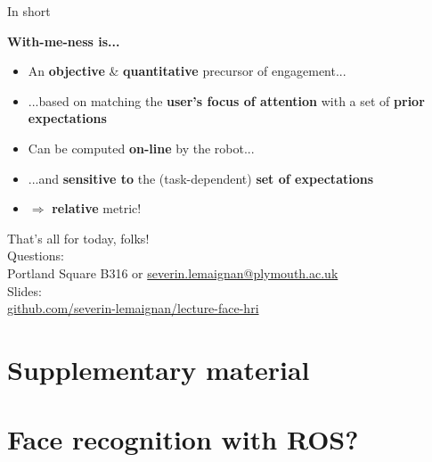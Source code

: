\documentclass[compress]{beamer}
\makeatletter
\def\beamer@writeslidentry@miniframesoff{%
  \expandafter\beamer@ifempty\expandafter{\beamer@framestartpage}{}%
  {%
    \clearpage\beamer@notesactions%
  }
}
\newcommand*{\miniframesoff}{\let\beamer@writeslidentry=\beamer@writeslidentry@miniframesoff}
\makeatother
\begin{document}

\begin{frame}{In short}

    {\bf With-me-ness is...}

    \begin{itemize}
        \item An {\bf objective} \& {\bf quantitative} precursor of engagement...
        \item ...based on matching the {\bf user's focus of attention} with a set of
            {\bf prior expectations}
        \item Can be computed {\bf on-line} by the robot...
        \item ...and {\bf sensitive to} the (task-dependent) {\bf set of
            expectations}
        \item $\Rightarrow$ {\bf relative} metric!
    \end{itemize}

\end{frame}


\miniframesoff

\begin{frame}{}
    \begin{center}
        \Large
        That's all for today, folks!\\[2em]
        \normalsize
        Questions:\\
        Portland Square B316 or \url{severin.lemaignan@plymouth.ac.uk} \\[1em]

        Slides:\\
        \href{https://github.com/severin-lemaignan/lecture-face-hri}{\small
        github.com/severin-lemaignan/lecture-face-hri}

    \end{center}
\end{frame}



\section[]{Supplementary material}

\section[]{Face recognition with ROS?}
\end{document}
